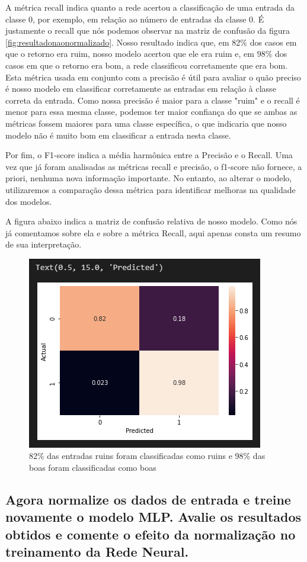 \documentclass[12pt]{article}
\begin{document}
A métrica recall indica quanto a rede acertou a classificação de uma entrada da classe 0, por exemplo, em relação ao número de entradas da classe 0. É justamente o recall que nós podemos observar na matriz de confusão da figura \ref{fig:resultadonaonormalizado}. Nosso resultado indica que, em 82\% dos casos em que o retorno era ruim, nosso modelo acertou que ele era ruim e, em 98\% dos casos em que o retorno era bom, a rede  classificou corretamente que era bom. Esta métrica usada em conjunto com a precisão é útil para avaliar o quão preciso é nosso modelo em classificar corretamente as entradas em relação à classe correta da entrada. Como nossa precisão é maior para a classe "ruim" e o recall é menor para essa mesma classe, podemos ter maior confiança do que se ambas as métricas fossem maiores para uma classe específica, o que indicaria que nosso modelo não é muito bom em classificar a entrada nesta classe.

Por fim, o F1-score  indica a média harmônica entre a Precisão e o Recall. Uma vez que já foram analisadas as métricas recall e precisão, o f1-score não fornece, a priori, nenhuma nova informação importante. No entanto, ao alterar o modelo, utilizaremos a comparação dessa métrica para identificar melhoras na qualidade dos modelos.

A figura abaixo indica a matriz de confusão relativa de nosso modelo. Como nós já comentamos sobre ela e sobre a métrica Recall, aqui apenas consta um resumo de sua interpretação.
\begin{figure}[H]
	\centering
	\includegraphics[width=0.5\linewidth]{Imagens/ConfusionMatrizNaoNormalizado}
	\caption{82\% das entradas ruins foram classificadas como ruins e 98\% das boas foram classificadas como boas}
	\label{fig:confusionmatriznaonormalizado}
\end{figure}




\subsection{Agora normalize os dados de entrada e treine novamente o modelo MLP.	Avalie os resultados obtidos e comente o efeito da normalização no	treinamento da Rede Neural.}\label{subsec:normalizada}
	
\end{document}
